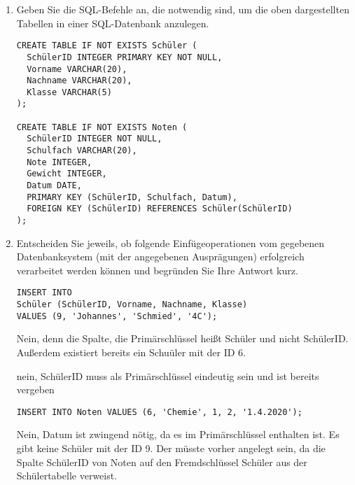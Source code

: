\documentclass{lehramt-informatik-aufgabe}
\begin{document}
\begin{enumerate}


\item Geben Sie die SQL-Befehle an, die notwendig sind, um die oben
dargestellten Tabellen in einer SQL-Datenbank anzulegen.

\begin{antwort}
\begin{verbatim}
CREATE TABLE IF NOT EXISTS Schüler (
  SchülerID INTEGER PRIMARY KEY NOT NULL,
  Vorname VARCHAR(20),
  Nachname VARCHAR(20),
  Klasse VARCHAR(5)
);

CREATE TABLE IF NOT EXISTS Noten (
  SchülerID INTEGER NOT NULL,
  Schulfach VARCHAR(20),
  Note INTEGER,
  Gewicht INTEGER,
  Datum DATE,
  PRIMARY KEY (SchülerID, Schulfach, Datum),
  FOREIGN KEY (SchülerID) REFERENCES Schüler(SchülerID)
);
\end{verbatim}
\end{antwort}


\item Entscheiden Sie jeweils, ob folgende Einfügeoperationen vom
gegebenen Datenbanksystem (mit der angegebenen Ausprägungen) erfolgreich
verarbeitet werden können und begründen Sie Ihre Antwort kurz.

\begin{verbatim}
INSERT INTO
Schüler (SchülerID, Vorname, Nachname, Klasse)
VALUES (9, 'Johannes', 'Schmied', '4C');
\end{verbatim}

\begin{antwort}[richtig]
Nein, denn die Spalte, die Primärschlüssel heißt Schüler und nicht
SchülerID. Außerdem existiert bereits ein Schuüler mit der ID 6.
\end{antwort}

\begin{antwort}
nein, SchülerID muss als Primärschlüssel eindeutig sein und ist bereits vergeben
\end{antwort}

\begin{verbatim}
INSERT INTO Noten VALUES (6, 'Chemie', 1, 2, '1.4.2020');
\end{verbatim}

\begin{antwort}[richtig]
Nein, Datum ist zwingend nötig, da es im Primärschlüssel enthalten ist.
Es gibt keine Schüler mit der ID 9. Der müsste vorher angelegt sein,
da die Spalte SchülerID von Noten auf den Fremdschlüssel Schüler aus
der Schülertabelle verweist.
\end{antwort}


\end{enumerate}
\end{document}
